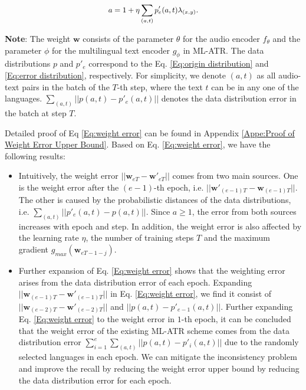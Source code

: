 \begin{equation}
\small
\begin{aligned}
a=1+\eta\sum_{(a,t)}p'_e(a,t)\lambda_{(x,y)}.
\end{aligned}
\end{equation}

\textbf{Note}: The weight $\mathbf w$ consists of the parameter $\theta$ for the audio encoder $f_\theta$ and the parameter $\phi$ for the multilingual text encoder $g_\phi$ in ML-ATR. The data distributions $p$ and $p'_e$ correspond to the Eq. \eqref{Eq:origin distribution} and \eqref{Eq:error distribution}, respectively. For simplicity, we denote $(a,t)$ as all audio-text pairs in the batch of the $T$-th step, where the text $t$ can be in any one of the languages. $\sum_{(a,t)}||p(a,t)-p'_e(a,t)||$ denotes the data distribution error in the batch at step $T$.

Detailed proof of Eq \eqref{Eq:weight error} can be found in Appendix \ref{Appe:Proof of Weight Error Upper Bound}. Based on Eq. \eqref{Eq:weight error}, we have the following results:

\begin{itemize}
    \item Intuitively, the weight error $||\mathbf w_{eT}-\mathbf w'_{eT}||$ comes from two main sources. One is the weight error after the $(e-1)$-th epoch, i.e. $||\mathbf w'_{(e-1)T}-\mathbf w_{(e-1)T}||$. The other is caused by the probabilistic distances of the data distributions, i.e. $\sum_{(a,t)}||p'_e(a,t)-p(a,t)||$. Since $a\geq 1$, the error from both sources increases with epoch and step. In addition, the weight error is also affected by the learning rate $\eta$, the number of training steps $T$ and the maximum gradient $g_{max}(\mathbf w_{eT-1-j})$.
    \item Further expansion of Eq. \eqref{Eq:weight error} shows that the weighting error arises from the data distribution error of each epoch. Expanding $||\mathbf w_{(e-1)T}-\mathbf w'_{(e-1)T}||$ in Eq. \eqref{Eq:weight error}, we find it consist of $||\mathbf w_{(e-2)T}-\mathbf w'_{(e-2)T}||$ and $||p(a,t)-p'_{e-1}(a,t)||$. Further expanding Eq. \eqref{Eq:weight error} to the weight error in $1$-th epoch, it can be concluded that the weight error of the existing ML-ATR scheme comes from the data distribution error $\sum^e_{i=1}\sum_{(a,t)}||p(a,t)-p'_i(a,t)||$ due to the randomly selected languages in each epoch. We can mitigate the inconsistency problem and improve the recall by reducing the weight error upper bound by reducing the data distribution error for each epoch.
\end{itemize}